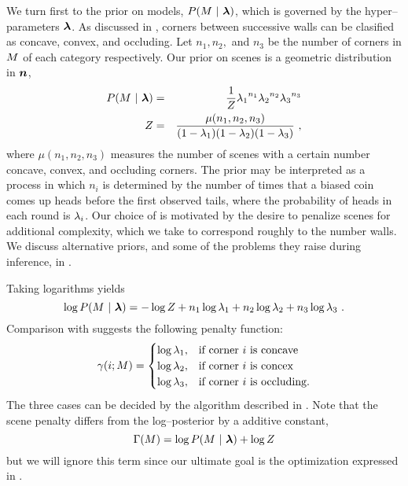 We turn first to the prior on models, $P(\Scene~|~\Penalties)$, which
is governed by the hyper--parameters $\Penalties$. As discussed in
, corners between successive walls can be
clasified as concave, convex, and occluding. Let $n_1, n_2,$ and $n_3$
be the number of corners in $\Scene$ of each category
respectively. Our prior on scenes is a geometric distribution in
$\vect{n}$,
\begin{eqnarray}
  \label{eq:scene-prior}
  P(\Scene ~|~ \Penalties) &=& \frac{1}{Z} 
    {\PenaltyConc}^{n_1} {\PenaltyConv}^{n_2} {\PenaltyOccl}^{n_3}\\
  Z &=& \frac{\mu(n_1,n_2,n_3)}{(1-\PenaltyConc)(1-\PenaltyConv)(1-\PenaltyOccl)}~,
\end{eqnarray}
where $\mu(n_1,n_2,n_3)$ measures the number of scenes with a certain
number concave, convex, and occluding corners. The prior
 may be interpreted as a process in which $n_i$ is
determined by the number of times that a biased coin comes up heads
before the first observed tails, where the probability of heads in
each round is $\Penalty_i$. Our choice of  is
motivated by the desire to penalize scenes for additional complexity,
which we take to correspond roughly to the number walls. We discuss
alternative priors, and some of the problems they raise during
inference, in .

Taking logarithms yields
\begin{equation}
  \label{eq:log-scene-prior}
  \log P(\Scene ~|~ \Penalties) =
    -\log Z +
    n_1\log\PenaltyConc + 
    n_2\log\PenaltyConv + 
    n_3\log\PenaltyOccl~.
\end{equation}
Comparison with  suggests the following
penalty function:
\begin{equation}
  \label{eq:corner-penalty}
  \CornerPenalty(i;\Scene) = 
  \begin{cases}
    \log \PenaltyConc, & \mbox{if corner $i$ is concave} \\
    \log \PenaltyConv, & \mbox{if corner $i$ is concex} \\
    \log \PenaltyOccl, & \mbox{if corner $i$ is occluding.} \\
  \end{cases}
\end{equation}
The three cases can be decided by the algorithm described in
. Note that the scene penalty differs from
the log--posterior by a additive constant,
\begin{equation}
  \ScenePenalty(\Scene) = \log P(\Scene ~|~ \Penalties) + \log Z
\end{equation}
but we will ignore this term since our ultimate goal is the
optimization expressed in .

